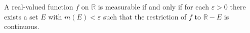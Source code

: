 A real-valued function $f$ on $\mathbb{R}$ is measurable if and only if for each $\varepsilon > 0$ there exists a set $E$ with $m(E) < \varepsilon$ such that the restriction of $f$ to $\mathbb{R} - E$ is continuous.
